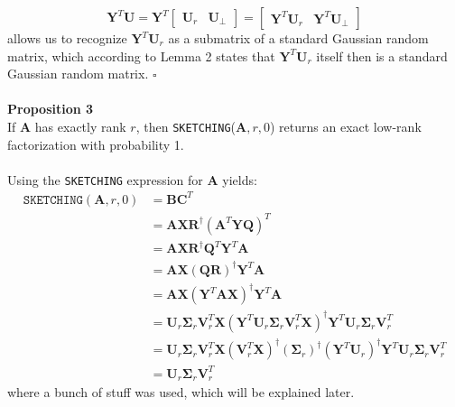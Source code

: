 \documentclass{article}
\begin{document}
\begin{equation}
\mathbf{Y}^T\mathbf{U} = \mathbf{Y}^T \begin{bmatrix}
	\mathbf{U}_r & \mathbf{U}_\perp
\end{bmatrix}	= \begin{bmatrix}
	\mathbf{Y}^T\mathbf{U}_r & \mathbf{Y}^T\mathbf{U}_\perp
\end{bmatrix}
\end{equation}
allows us to recognize $\mathbf{Y}^T\mathbf{U}_r$ as a submatrix of a standard Gaussian random matrix, which according to Lemma 2 states that $\mathbf{Y}^T\mathbf{U}_r$ itself then is a standard  Gaussian random matrix. $\square$
\\\\
\textbf{Proposition 3}\\
If $\mathbf{A}$ has exactly rank $r$, then \texttt{SKETCHING}($\mathbf{A}, r, 0$) returns an exact low-rank factorization with probability 1. 
\\\\
Using the \texttt{SKETCHING} expression for $\mathbf{A}$ yields:
\begin{align}
\texttt{SKETCHING}(\mathbf{A}, r, 0) &= \mathbf{B}\mathbf{C}^T \\
&= \mathbf{A}\mathbf{X}\mathbf{R}^\dag(\mathbf{A}^T\mathbf{Y}\mathbf{Q})^T \\
&= \mathbf{A}\mathbf{X}\mathbf{R}^\dag \mathbf{Q}^T \mathbf{Y}^T \mathbf{A} \\
&= \mathbf{A}\mathbf{X}(\mathbf{Q}\mathbf{R})^\dag \mathbf{Y}^T\mathbf{A} \\
&= \mathbf{A} \mathbf{X} \left(\mathbf{Y}^T\mathbf{A}\mathbf{X}\right)^\dag \mathbf{Y}^T\mathbf{A} \\
&= \mathbf{U}_r\mathbf{\Sigma}_r\mathbf{V}_r^T \mathbf{X}\left(\mathbf{Y}^T\mathbf{U}_r\mathbf{\Sigma}_r\mathbf{V}_r^T \mathbf{X}\right)^\dag \mathbf{Y}^T\mathbf{U}_r\mathbf{\Sigma}_r\mathbf{V}_r^T \\
&= \mathbf{U}_r\mathbf{\Sigma}_r\mathbf{V}_r^T \mathbf{X}\left(\mathbf{V}_r^T\mathbf{X}\right)^\dag \left(\mathbf{\Sigma}_r\right)^\dag \left(\mathbf{Y}^T\mathbf{U}_r\right)^\dag \mathbf{Y}^T\mathbf{U}_r \mathbf{\Sigma}_r\mathbf{V}_r^T \\
&= \mathbf{U}_r\mathbf{\Sigma}_r\mathbf{V}_r^T
\end{align}
where a bunch of stuff was used, which will be explained later. 
\end{document}
